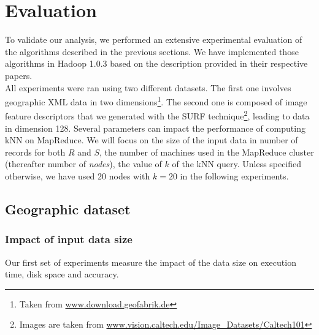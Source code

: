 \section{Evaluation}
To validate our analysis, we performed an extensive experimental evaluation of the algorithms described in the 
previous sections. We have implemented those algorithms in Hadoop 1.0.3 based on the description provided in their 
respective papers. \\
All experiments were ran using two different datasets. The first one  
involves geographic XML data in two dimensions\footnote{Taken from \url{www.download.geofabrik.de}}. The second one is composed of image feature descriptors that we generated 
with the SURF \cite{SURF} technique\footnote{Images are taken 
from  \url{www.vision.caltech.edu/Image_Datasets/Caltech101}}, leading to data in dimension 128. 
Several parameters can impact the performance of computing kNN on MapReduce. We will focus on the size of the 
input data in number of records for both $R$ and $S$, the number of machines used in the MapReduce cluster (thereafter 
number of \emph{nodes}), the value of $k$ of the kNN query. Unless specified otherwise, we have used 20 nodes with $k=20$ 
in the following experiments. 

\subsection{Geographic dataset}
\subsubsection{Impact of input data size}
Our first set of experiments measure the impact of the data size on execution time, disk space and accuracy. 
